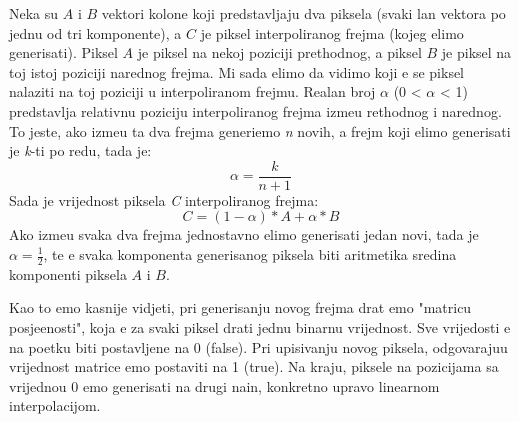 Neka su $A$ i $B$ vektori kolone koji predstavljaju dva piksela (svaki \ch lan vektora po jednu od tri komponente), a $C$ je piksel interpoliranog frejma (kojeg \zh elimo generisati). Piksel $A$ je piksel na nekoj poziciji prethodnog, 
a piksel $B$ je piksel na toj istoj
poziciji narednog frejma. Mi sada \zh elimo da vidimo koji \cj e se piksel nalaziti na toj poziciji u interpoliranom frejmu. Realan broj $\alpha$ (0 < $\alpha$ < 1) predstavlja relativnu poziciju interpoliranog frejma izme\dj u
rethodnog i narednog. To jeste, ako izme\dj u ta dva frejma generi\sh emo \textit{n} novih, a frejm koji \zh elimo generisati je \textit{k}-ti po redu, tada je:
\begin{equation}
\alpha=\frac{k}{n+1}
\end{equation}
Sada je vrijednost piksela \textit{C} interpoliranog frejma:
\begin{equation}
C=(1-\alpha)*A+\alpha*B
\end{equation}
Ako izme\dj u svaka dva frejma jednostavno \zh elimo generisati jedan novi, tada je $\alpha=\frac{1}{2}$, te \cj e svaka komponenta generisanog piksela biti aritmeti\ch ka sredina komponenti piksela $A$ i $B$.

Kao \sh to \cj emo kasnije vidjeti, pri generisanju novog frejma dr\zh at \cj emo "matricu posje\cj enosti", koja \cj e za svaki piksel dr\zh ati jednu binarnu vrijednost. Sve vrijedosti \cj e na po\ch etku biti postavljene na 0 (false).
Pri upisivanju novog piksela, odgovaraju\cj u vrijednost matrice \cj emo postaviti na 1 (true). Na kraju, piksele na pozicijama sa vrijedno\sh \cj u 0 \cj emo generisati na drugi na\ch in, konkretno upravo linearnom interpolacijom.